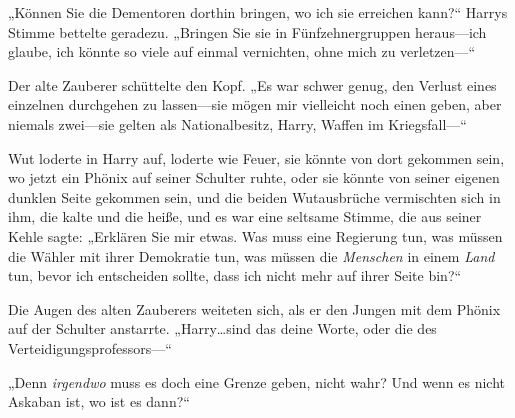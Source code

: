 „Können Sie die Dementoren dorthin bringen, wo ich sie erreichen kann?“ Harrys Stimme bettelte geradezu.
„Bringen Sie sie in Fünfzehnergruppen heraus—ich glaube, ich könnte so viele auf einmal vernichten, ohne mich zu verletzen—“

Der alte Zauberer schüttelte den Kopf.
„Es war schwer genug, den Verlust eines einzelnen durchgehen zu lassen—sie mögen mir vielleicht noch einen geben, aber niemals zwei—sie gelten als Nationalbesitz, Harry, Waffen im Kriegsfall—“

Wut loderte in Harry auf, loderte wie Feuer, sie könnte von dort gekommen sein, wo jetzt ein Phönix auf seiner Schulter ruhte, oder sie könnte von seiner eigenen dunklen Seite gekommen sein, und die beiden Wutausbrüche vermischten sich in ihm, die kalte und die heiße, und es war eine seltsame Stimme, die aus seiner Kehle sagte:
„Erklären Sie mir etwas. Was muss eine Regierung tun, was müssen die Wähler mit ihrer Demokratie tun, was müssen die \emph{Menschen} in einem \emph{Land} tun, bevor ich entscheiden sollte, dass ich nicht mehr auf ihrer Seite bin?“

Die Augen des alten Zauberers weiteten sich, als er den Jungen mit dem Phönix auf der Schulter anstarrte.
„Harry…sind das deine Worte, oder die des Verteidigungsprofessors—“

„Denn \emph{irgendwo} muss es doch eine Grenze geben, nicht wahr? Und wenn es nicht Askaban ist, wo ist es dann?“

